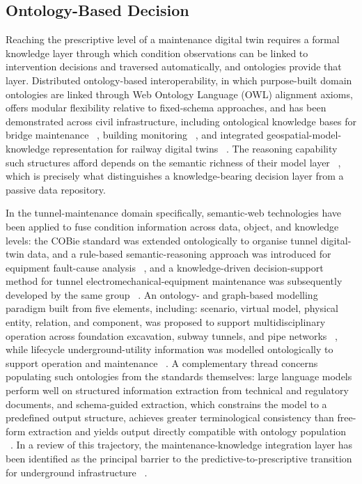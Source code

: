\documentclass[preprint,12pt,authoryear]{elsarticle}
\begin{document}
\subsection{\textbf{Ontology-Based Decision}}\label{ontology-based-decision}

Reaching the prescriptive level of a maintenance digital twin requires a
formal knowledge layer through which condition observations can be
linked to intervention decisions and traversed automatically, and
ontologies provide that layer. Distributed ontology-based
interoperability, in which purpose-built domain ontologies are linked
through Web Ontology Language (OWL) alignment axioms, offers modular
flexibility relative to fixed-schema approaches, and has been
demonstrated across civil infrastructure, including ontological
knowledge bases for bridge maintenance ~\citep{Ren2019}, building
monitoring ~\citep{Mahdavi2017}, and integrated
geospatial-model-knowledge representation for railway digital twins ~\citep{Li2022}. The reasoning capability such structures afford depends
on the semantic richness of their model layer ~\citep{Tao2019b}, which
is precisely what distinguishes a knowledge-bearing decision layer from
a passive data repository.

In the tunnel-maintenance domain specifically, semantic-web technologies
have been applied to fuse condition information across data, object, and
knowledge levels: the COBie standard was extended ontologically to
organise tunnel digital-twin data, and a rule-based semantic-reasoning
approach was introduced for equipment fault-cause analysis ~\citep{Yu2021}, and a knowledge-driven decision-support method for tunnel
electromechanical-equipment maintenance was subsequently developed by
the same group ~\citep{Yu2023}. An ontology- and graph-based modelling
paradigm built from five elements, including: scenario, virtual model,
physical entity, relation, and component, was proposed to support
multidisciplinary operation across foundation excavation, subway
tunnels, and pipe networks ~\citep{Li2024_2}, while lifecycle
underground-utility information was modelled ontologically to support
operation and maintenance ~\citep{Wang2021}. A complementary thread concerns
populating such ontologies from the standards themselves: large language
models perform well on structured information extraction from technical
and regulatory documents, and schema-guided extraction, which constrains
the model to a predefined output structure, achieves greater
terminological consistency than free-form extraction and yields output
directly compatible with ontology population ~\citep{Caufield2024, Dagdelen2024}.
In a review of this trajectory, the maintenance-knowledge integration
layer has been identified as the principal barrier to the
predictive-to-prescriptive transition for underground infrastructure
~\citep{Zhu2025}.
\end{document}
